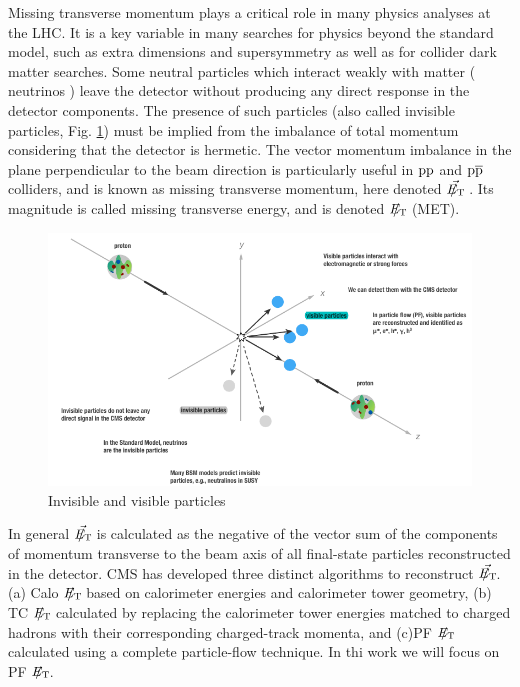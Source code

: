 Missing transverse momentum plays a critical role in many physics analyses at the LHC. It is a key variable in many searches for physics beyond the standard model, such as extra dimensions and supersymmetry as well as for collider dark matter searches. Some neutral particles which interact weakly with matter ( \ie   neutrinos ) leave the detector without producing any direct response in the detector components. The presence of such particles (also called invisible particles, Fig. \ref{figuremet1}) must be implied from the imbalance of total momentum considering that the detector is hermetic. The vector momentum imbalance in the plane perpendicular to the beam direction is particularly useful in $\mathrm{p}\mathrm{p}$ and $\mathrm{p}\overline{\mathrm{p}}$ colliders, and is known as missing transverse momentum, here denoted $\vec{E_{\mathrm{T}}\hspace{-1.1em}/\kern0.45em}$ . Its magnitude is called missing transverse energy, and is denoted $E_{\mathrm{T}}\hspace{-1.1em}/\kern0.45em$ (MET).

\begin{figure}[H]
\caption{Invisible and visible particles \label{figuremet1}}
  \centering
\includegraphics[width=14cm]{physics_objects_plots/met_rec}
\end{figure}

In general $\vec{E_{\mathrm{T}}\hspace{-1.1em}/\kern0.45em}$ is calculated as the negative of the vector sum of the components of momentum transverse to the beam axis of all final-state particles reconstructed in the detector. CMS has developed three distinct algorithms to reconstruct $\vec{E_{\mathrm{T}}\hspace{-1.1em}/\kern0.45em}$. (a) Calo $E_{\mathrm{T}}\hspace{-1.1em}/\kern0.45em$  based on calorimeter energies and calorimeter tower geometry, (b) TC $E_{\mathrm{T}}\hspace{-1.1em}/\kern0.45em$ calculated by replacing the calorimeter tower energies matched to charged hadrons with their corresponding charged-track momenta, and (c)PF $E_{\mathrm{T}}\hspace{-1.1em}/\kern0.45em$ calculated using a complete particle-flow technique. In thi work we will focus on PF $E_{\mathrm{T}}\hspace{-1.1em}/\kern0.45em$.


